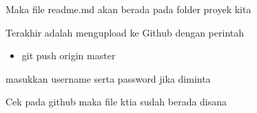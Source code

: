 \vspace{14pt}
\noindent 
{\fontsize{14pt}{14pt}\selectfont Maka file readme.md akan berada pada folder proyek kita \\} \par
\vspace{14pt}
\noindent 
{\fontsize{14pt}{14pt}\selectfont Terakhir adalah mengupload ke Github dengan perintah \\} \par
\begin{itemize}
	\item git push origin master
\end{itemize}

\vspace{14pt}
\noindent 
{\fontsize{14pt}{14pt}\selectfont masukkan username serta password jika diminta \\} \par
\noindent 
{\fontsize{14pt}{14pt}\selectfont Cek pada github maka file ktia sudah berada disana \\} \par
\vspace{14pt}
